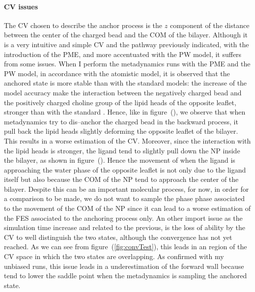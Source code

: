 \paragraph{\textbf{CV issues}} The \ac{CV} chosen to describe the anchor process is the $z$ component of the distance between the center of the charged bead and the \ac{COM} of the bilayer. Although it is a very intuitive and simple \ac{CV} and the pathway previously indicated, with the introduction of the \ac{PME}, and more accentuated with the \ac{PW} model, it suffers from some issues. When I perform the metadynamics runs with the \ac{PME} and the \ac{PW} model, in accordance with the atomistic model, it is observed that the anchored state is more stable than with the standard \martini models: the increase of the model accuracy make the interaction between the negatively charged bead and the positively charged choline group of the lipid heads of the opposite leaflet, stronger than with the standard \martini. Hence, like in figure~(), we observe that when metadynamics try to dis--anchor the charged bead in the backward process, it pull back the lipid heads slightly deforming the opposite leaflet of the bilayer. This results in a worse estimation of the \ac{CV}. Moreover, since the interaction with the lipid heads is stronger, the ligand tend to slightly pull down the \ac{NP} inside the bilayer, as shown in figure~(). Hence the movement of when the ligand is approaching the water phase of the opposite leaflet is not only due to the ligand itself but also because the \ac{COM} of the \ac{NP} tend to approach the center of the bilayer. Despite this can be an important molecular process, for now, in order for a comparison to be made, we do not want to sample the phase phase associated to the movement of the \ac{COM} of the \ac{NP} since it can lead to a worse estimation of the \ac{FES} associated to the anchoring process only. An other import issue as the simulation time increase and related to the previous, is the loss of ability by the \ac{CV} to well distinguish the two states, although the convergence has not yet reached. As we can see from figure~(\ref{fig:convTest}), this leads in an region of the \ac{CV} space in which the two states are overlapping. As confirmed with my unbiased runs, this issue leads in a underestimation of the forward wall because tend to lower the saddle point when the metadynamics is sampling the anchored state.
